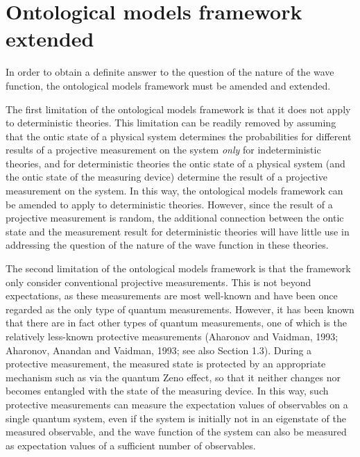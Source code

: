 \section{Ontological models framework extended}

In order to obtain a definite answer to the question of the nature of the wave function, the ontological models framework must be amended and extended.

The first limitation of the ontological models framework is that it does not apply to deterministic theories. 
This limitation can be readily removed by assuming that the ontic state of a physical system determines the probabilities for different results of a projective measurement on the system \emph{only} for indeterministic theories, and for deterministic theories the ontic state of a physical system (and the ontic state of the measuring device) determine the result of a projective measurement on the system.
In this way, the ontological models framework can be amended to apply to deterministic theories. 
However, since the result of a projective measurement is random, the additional connection between the ontic state and the measurement result for deterministic theories will have little use in addressing the question of the nature of the wave function in these theories.

The second limitation of the ontological models framework is that the framework only consider conventional projective measurements. This is not beyond expectations, as these measurements are most well-known and have been once regarded as the only type of quantum measurements. However, it has been known that there are in fact other types of quantum measurements, one of which is the relatively less-known protective measurements (Aharonov and Vaidman, 1993; Aharonov, Anandan and Vaidman, 1993; see also Section 1.3). 
During a protective measurement, the measured state is protected by an appropriate mechanism such as via the quantum Zeno effect, so that it neither changes nor becomes entangled with the state of the measuring device. In this way, such protective measurements can measure the expectation values of observables on a single quantum system, even if the system is initially not in an eigenstate of the measured observable, and the wave function of the system can also be measured as expectation values of a sufficient number of observables.

